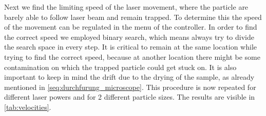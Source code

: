 \documentclass[12pt,english]{scrartcl}
\begin{document}
Next we find the limiting speed of the laser movement, where the particle are
barely able to follow laser beam and remain trapped. To determine this the
speed of the movement can be regulated in the menu of the controller. In order
to find the correct speed we employed binary search, which means always try to
divide the search space in every step. It is critical to remain at the same
location while trying to find the correct speed, because at another location
there might be some contamination on which the trapped particle could get stuck
on. It is also important to keep in mind the drift due to the drying of the
sample, as already mentioned in \autoref{seq:durchfurung_microscope}. This
procedure is now repeated for different laser powers and for 2 different
particle sizes. The results are visible in \autoref{tab:velocities}.
\end{document}

